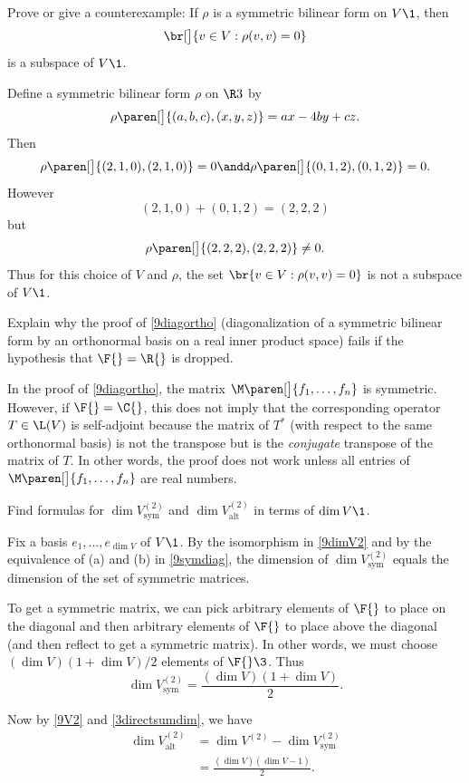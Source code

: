 \exercise
Prove or give a counterexample: If $\rho$ is a symmetric bilinear form on $V\1$, then
\[
\br[\big]{v \in V: \rho(v, v) = 0}
\]
is a subspace of $V\1$.

\begin{Solution}
Define a symmetric bilinear form $\rho$ on $\R3$ by
\[
\rho\paren[\big]{(a,b,c), (x,y,z) } = ax - 4by + cz.
\]
Then
\[
\rho\paren[\big]{(2,1,0),(2,1,0) } = 0 \andd \rho\paren[\big]{(0,1,2),(0,1,2)} = 0.
\]
However
\[
(2,1,0)  + (0, 1,2) = (2,2,2)
\]
but
\[
\rho\paren[\big]{(2,2,2), (2,2,2)} \ne 0.
\]
Thus for this choice of $V$ and $\rho$, the set $\br{v \in V: \rho(v, v) = 0}$ is not a subspace of $V\1$.
\end{Solution}

\exercise
Explain why the proof of \ref{9diagortho} (diagonalization of a symmetric bilinear form by an orthonormal basis on a real inner product space) fails if the hypothesis that $\F{} = \R{}$ is dropped.

\begin{Solution}
In the proof of \ref{9diagortho}, the matrix $\M\paren[\big]{ f_1, \ldots, f_n }$ is symmetric. However, if $\F{} = \C{}$, this does not imply that the corresponding operator $T \in \L(V)$ is self-adjoint because the matrix of $T^*$ (with respect to the same orthonormal basis) is not the transpose but is the \emph{conjugate} transpose of the matrix of $T$. In other words, the proof does not work unless all entries of $\M\paren[\big]{ f_1, \ldots, f_n }$ are real numbers.
\end{Solution}

\exercise
Find formulas for $\dim V^{(2)}_{\text{sym}}$ and $\dim V^{(2)}_{\text{alt}}$ in terms of $\dim V\1$.

\begin{Solution}
Fix a basis $e_1, \ldots, e_{\dim V}$ of $V\1$. By the isomorphism in \ref{9dimV2} and by the equivalence of (a) and (b) in \ref{9symdiag}, the dimension of $\dim V^{(2)}_{\text{sym}}$ equals the dimension of the set of symmetric  matrices.

To get a symmetric  matrix, we can pick arbitrary elements of $\F{}$ to place on the diagonal and then arbitrary elements of $\F{}$ to place above the diagonal (and then reflect to get a symmetric matrix). In other words, we must choose $(\dim V)(1 + \dim V)/2$ elements of $\F{}\3$. Thus
\[
\dim V^{(2)}_{\text{sym}} = \frac{ (\dim V)(1 + \dim V) }{2}.
\]

Now by \ref{9V2} and \ref{3directsumdim}, we have
\begin{align*}
\dim V^{(2)}_{\text{alt}} &= \dim V^{(2)} - \dim V^{(2)}_{\text{sym}} \\[6bp]
&= \frac{ (\dim V)(\dim V - 1) }{2}.
\end{align*}
\end{Solution}

